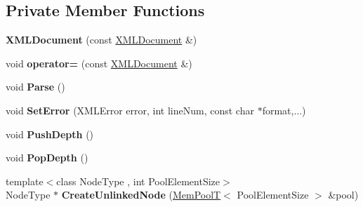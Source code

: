 \subsection*{Private Member Functions}
\begin{DoxyCompactItemize}
\item 
{\bfseries X\+M\+L\+Document} (const \hyperlink{classtinyxml2_1_1XMLDocument}{X\+M\+L\+Document} \&)\hypertarget{classtinyxml2_1_1XMLDocument_adcea490db02a099d99440cd14a87d9e4}{}\label{classtinyxml2_1_1XMLDocument_adcea490db02a099d99440cd14a87d9e4}

\item 
void {\bfseries operator=} (const \hyperlink{classtinyxml2_1_1XMLDocument}{X\+M\+L\+Document} \&)\hypertarget{classtinyxml2_1_1XMLDocument_aa542c2cf1276ee4bd778f16d196fe222}{}\label{classtinyxml2_1_1XMLDocument_aa542c2cf1276ee4bd778f16d196fe222}

\item 
void {\bfseries Parse} ()\hypertarget{classtinyxml2_1_1XMLDocument_aeb556e0e2bed02a73a6c5aaf19759e9a}{}\label{classtinyxml2_1_1XMLDocument_aeb556e0e2bed02a73a6c5aaf19759e9a}

\item 
void {\bfseries Set\+Error} (X\+M\+L\+Error error, int line\+Num, const char $\ast$format,...)\hypertarget{classtinyxml2_1_1XMLDocument_abffeba53b165f55f385ea7063a93bc95}{}\label{classtinyxml2_1_1XMLDocument_abffeba53b165f55f385ea7063a93bc95}

\item 
void {\bfseries Push\+Depth} ()\hypertarget{classtinyxml2_1_1XMLDocument_a4d4aa7ec8e078ee6b449471e187d2d67}{}\label{classtinyxml2_1_1XMLDocument_a4d4aa7ec8e078ee6b449471e187d2d67}

\item 
void {\bfseries Pop\+Depth} ()\hypertarget{classtinyxml2_1_1XMLDocument_a863c45ff542c2b76af0e6c227a743c85}{}\label{classtinyxml2_1_1XMLDocument_a863c45ff542c2b76af0e6c227a743c85}

\item 
{\footnotesize template$<$class Node\+Type , int Pool\+Element\+Size$>$ }\\Node\+Type $\ast$ {\bfseries Create\+Unlinked\+Node} (\hyperlink{classtinyxml2_1_1MemPoolT}{Mem\+PoolT}$<$ Pool\+Element\+Size $>$ \&pool)\hypertarget{classtinyxml2_1_1XMLDocument_acda2123b71a6e6534be9f48e75ea680a}{}\label{classtinyxml2_1_1XMLDocument_acda2123b71a6e6534be9f48e75ea680a}

\end{DoxyCompactItemize}
